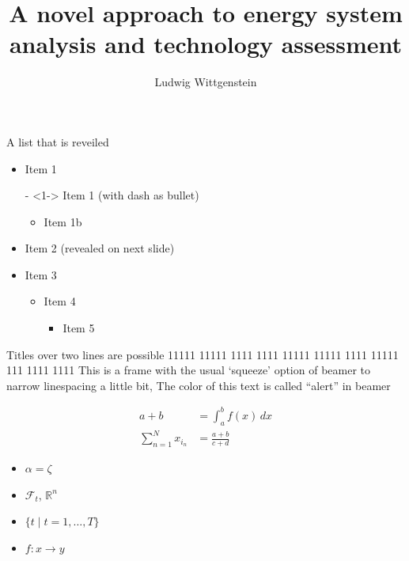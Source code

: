 \documentclass[aspectratio=43]{beamer}
\begin{document}
\title{A novel approach to energy system analysis and technology assessment}
\author{Ludwig Wittgenstein}


\begin{frame}[plain] %
  \titlepage
\end{frame}


\begin{frame}{A list that is reveiled}  
  \begin{itemize}
  \item<1-> Item 1
  \item[-]<1->  Item 1 (with dash as bullet)
    \begin{itemize}
    \item<1-> Item 1b
    \end{itemize}
  \item<2->  Item 2 (revealed on next slide)
  \item<3-> Item 3
    \begin{itemize}
    \item<3-> Item 4
      \begin{itemize}
      \item<3-> Item 5
      \end{itemize}
    \end{itemize}
  \end{itemize}
 \vspace*{\fill} %
\end{frame}



\begin{frame}[squeeze]{Titles over two lines are possible 11111 11111 1111 1111  11111 11111 1111  11111 111  1111 1111}
  \alert{This is a frame with the usual `squeeze' option of beamer to narrow linespacing a little bit, The color of this text is called ``alert'' in beamer}
  
  \begin{align*}
    a + b  & = \int_a^b f(x)\,dx \\
    \sum_{n=1}^N x_{i_n} &= \frac{a+b}{c+d} 
  \end{align*}
  \begin{itemize}
  \item  $\alpha = \zeta$ 
  \item $\mathcal{F}_t$, $\mathbb{R}^n$
  \item $\{t \mid t=1,\dots,T\}$
  \item $f\colon x\to y$
  \end{itemize}  
\end{frame}
\end{document}
